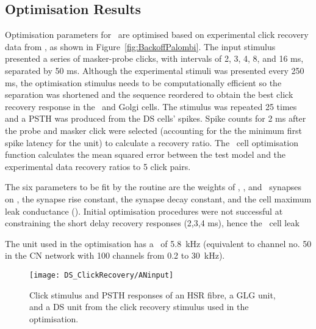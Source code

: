 

\subsection{Optimisation Results}    \label{sec:DS:results}

Optimisation parameters for \GLGDS~are optimised based on experimental click recovery data from \citep{BackoffPalombiEtAl:1997}, as shown in Figure~\ref{fig:BackoffPalombi}.
The input stimulus presented a series of masker-probe clicks, with intervals of 2, 3, 4, 8, and 16 ms, separated by 50 ms.
Although the experimental stimuli was presented every 250 ms, the optimisation stimulus needs to be computationally efficient so the separation was shortened and the sequence reordered to obtain the best click recovery response in the \DS~and Golgi cells.
The stimulus was repeated 25 times and a PSTH was produced from the DS cells' spikes.
Spike counts for 2 ms after the probe and masker click were selected (accounting for the the minimum first spike latency for the unit) to calculate a recovery ratio.
The \DS~cell optimisation function calculates the mean squared error between the test model and the experimental data recovery ratios to 5 click pairs.


The six parameters to be fit by the routine are the weights of \GLG\@, \HSR\@, and \LSR~synapses on \DS, the \GABAa synapse rise constant, the \GABAa synapse decay constant, and the \DS cell maximum leak conductance (\gleak).
Initial optimisation procedures were not successful at constraining the short delay recovery responses (2,3,4 ms), hence the \DS~cell leak %

The unit used in the optimisation has a \CF~of 5.8~kHz (equivalent to channel no. 50 in the CN network with 100 channels from 0.2 to 30~kHz).

\begin{figure}[htb]
\centering
\texttt{[image: DS\_ClickRecovery/ANinput]}
\caption[Click recovery stimulus]{Click stimulus and PSTH responses of an HSR fibre, a GLG unit, and a DS unit from the click recovery stimulus used in the optimisation. 
\label{fig:ClickExamples}}
\end{figure}



